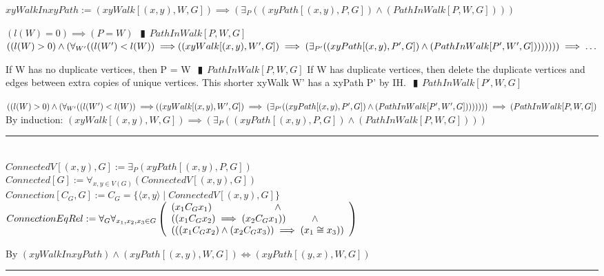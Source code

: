 \documentclass{book}
\newcommand{\abr}{:=}
\newcommand{\pipe}{$\phantom{(}\vrectangleblack\phantom{)}$}
\newcommand{\st}{\mathbin{|}}
\begin{document}
$xyWalkInxyPath \abr (xyWalk[(x, y), W, G]) \implies (\exists_{P}((xyPath[(x, y), P, G]) \land (PathInWalk[P, W, G])))$
\begin{enumerate}
  \lit $(l(W) = 0) \implies (P = W)$ \pipe $PathInWalk[P, W, G]$
  \lit $((l(W) > 0) \land (\forall_{W'}((l(W') < l(W)) \implies \\
        ((xyWalk[(x, y), W', G]) \implies (\exists_{P'}((xyPath[(x, y), P', G]) \land (PathInWalk[P', W', G]))))))) \implies \ldots$
  \begin{enumerate}
    \lit If W has no duplicate vertices, then P = W \pipe $PathInWalk[P, W, G]$
    \lit If W has duplicate vertices, then delete the duplicate vertices and edges between extra copies of unique vertices. This shorter xyWalk W' has a xyPath P' by IH. \pipe $PathInWalk[P', W, G]$
  \end{enumerate}
  \lit $((l(W) > 0) \land (\forall_{W'}((l(W') < l(W)) \implies \\
  ((xyWalk[(x, y), W', G]) \implies (\exists_{P'}((xyPath[(x, y), P', G]) \land (PathInWalk[P', W', G]))))))) \implies (PathInWalk[P, W, G])$
  \lit By induction: $(xyWalk[(x, y), W, G]) \implies (\exists_{P}((xyPath[(x, y), P, G]) \land (PathInWalk[P, W, G])))$
\end{enumerate} \vspace{.75mm} \hrule \vspace{.75mm} \ \\ 

$ConnectedV[(x, y), G] \abr \exists_{P}(xyPath[(x, y), P, G])$ \\
$Connected[G] \abr \forall_{x, y \in V(G)}(ConnectedV[(x, y), G])$ \\
$Connection[C_G, G] \abr C_G = \{\langle x, y \rangle \st ConnectedV[(x, y), G]\}$ \\
$ConnectionEqRel \abr \forall_{G} \forall_{x_1, x_2, x_3 \in G}
\left(\begin{array}{ll}
  (x_1 C_G x_1) \hfill \land \hfill \\
  ((x_1 C_G x_2) \implies (x_2 C_G x_1)) \hfill \land \hfill \\
  (((x_1 C_G x_2) \land (x_2 C_G x_3)) \implies (x_1 \cong x_3)) \\
\end{array}\right)$
\begin{enumerate}
  \lit By $(xyWalkInxyPath) \land (xyPath[(x, y), W, G]) \iff (xyPath[(y, x), W, G])$
\end{enumerate} \vspace{.75mm} \hrule \vspace{.75mm} \ \\ 
\end{document}
